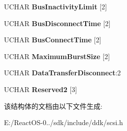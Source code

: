\begin{DoxyCompactItemize}
U\+C\+H\+AR {\bfseries Bus\+Inactivity\+Limit} \mbox{[}2\mbox{]}
\item 
\mbox{\label{struct___m_o_d_e___d_i_s_c_o_n_n_e_c_t___p_a_g_e_a0acc36035894d1db65862493baf11c22}} 
U\+C\+H\+AR {\bfseries Bus\+Disconnect\+Time} \mbox{[}2\mbox{]}
\item 
\mbox{\label{struct___m_o_d_e___d_i_s_c_o_n_n_e_c_t___p_a_g_e_ac2f017e0427d5943e9b84d526a702fbc}} 
U\+C\+H\+AR {\bfseries Bus\+Connect\+Time} \mbox{[}2\mbox{]}
\item 
\mbox{\label{struct___m_o_d_e___d_i_s_c_o_n_n_e_c_t___p_a_g_e_a9449c467f51beaa02d28e793a30ee555}} 
U\+C\+H\+AR {\bfseries Maximum\+Burst\+Size} \mbox{[}2\mbox{]}
\item 
\mbox{\label{struct___m_o_d_e___d_i_s_c_o_n_n_e_c_t___p_a_g_e_a5a8160680dc775d741eb3822fa4095db}} 
U\+C\+H\+AR {\bfseries Data\+Transfer\+Disconnect}\+:2
\item 
\mbox{\label{struct___m_o_d_e___d_i_s_c_o_n_n_e_c_t___p_a_g_e_a9732a72b6f6796973e437410d897540f}} 
U\+C\+H\+AR {\bfseries Reserved2} \mbox{[}3\mbox{]}
\end{DoxyCompactItemize}


该结构体的文档由以下文件生成\+:\begin{DoxyCompactItemize}
\item 
E\+:/\+React\+O\+S-\/0../sdk/include/ddk/scsi.\+h\end{DoxyCompactItemize}
